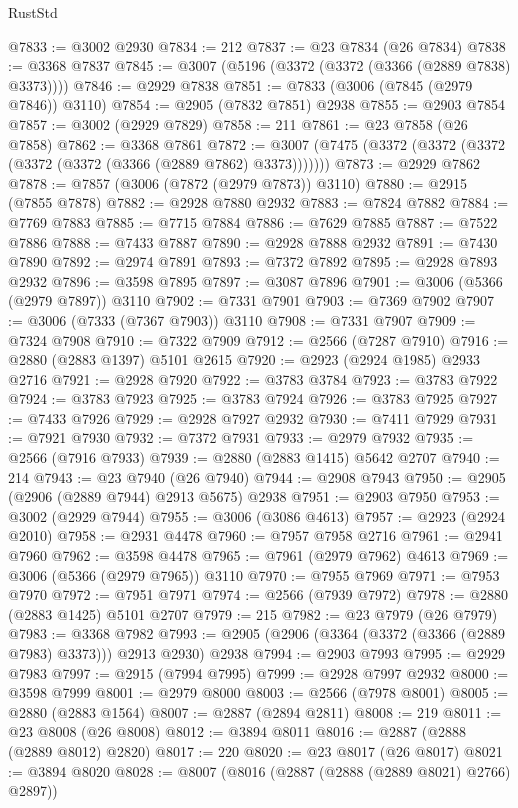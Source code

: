 \begin{lexlean}{RustStd}
\begin{coremodule}
@7833 := @3002 @2930
@7834 := 212
@7837 := @23 @7834 (@26 @7834)
@7838 := @3368 @7837
@7845 := @3007 (@5196 (@3372 (@3372 (@3366 (@2889 @7838) @3373))))
@7846 := @2929 @7838
@7851 := @7833 (@3006 (@7845 (@2979 @7846)) @3110)
@7854 := @2905 (@7832 @7851) @2938
@7855 := @2903 @7854
@7857 := @3002 (@2929 @7829)
@7858 := 211
@7861 := @23 @7858 (@26 @7858)
@7862 := @3368 @7861
@7872 := @3007 (@7475 (@3372 (@3372 (@3372 (@3372 (@3372 (@3366 (@2889 @7862) @3373)))))))
@7873 := @2929 @7862
@7878 := @7857 (@3006 (@7872 (@2979 @7873)) @3110)
@7880 := @2915 (@7855 @7878)
@7882 := @2928 @7880 @2932
@7883 := @7824 @7882
@7884 := @7769 @7883
@7885 := @7715 @7884
@7886 := @7629 @7885
@7887 := @7522 @7886
@7888 := @7433 @7887
@7890 := @2928 @7888 @2932
@7891 := @7430 @7890
@7892 := @2974 @7891
@7893 := @7372 @7892
@7895 := @2928 @7893 @2932
@7896 := @3598 @7895
@7897 := @3087 @7896
@7901 := @3006 (@5366 (@2979 @7897)) @3110
@7902 := @7331 @7901
@7903 := @7369 @7902
@7907 := @3006 (@7333 (@7367 @7903)) @3110
@7908 := @7331 @7907
@7909 := @7324 @7908
@7910 := @7322 @7909
@7912 := @2566 (@7287 @7910)
@7916 := @2880 (@2883 @1397) @5101 @2615
@7920 := @2923 (@2924 @1985) @2933 @2716
@7921 := @2928 @7920
@7922 := @3783 @3784
@7923 := @3783 @7922
@7924 := @3783 @7923
@7925 := @3783 @7924
@7926 := @3783 @7925
@7927 := @7433 @7926
@7929 := @2928 @7927 @2932
@7930 := @7411 @7929
@7931 := @7921 @7930
@7932 := @7372 @7931
@7933 := @2979 @7932
@7935 := @2566 (@7916 @7933)
@7939 := @2880 (@2883 @1415) @5642 @2707
@7940 := 214
@7943 := @23 @7940 (@26 @7940)
@7944 := @2908 @7943
@7950 := @2905 (@2906 (@2889 @7944) @2913 @5675) @2938
@7951 := @2903 @7950
@7953 := @3002 (@2929 @7944)
@7955 := @3006 (@3086 @4613)
@7957 := @2923 (@2924 @2010)
@7958 := @2931 @4478
@7960 := @7957 @7958 @2716
@7961 := @2941 @7960
@7962 := @3598 @4478
@7965 := @7961 (@2979 @7962) @4613
@7969 := @3006 (@5366 (@2979 @7965)) @3110
@7970 := @7955 @7969
@7971 := @7953 @7970
@7972 := @7951 @7971
@7974 := @2566 (@7939 @7972)
@7978 := @2880 (@2883 @1425) @5101 @2707
@7979 := 215
@7982 := @23 @7979 (@26 @7979)
@7983 := @3368 @7982
@7993 := @2905 (@2906 (@3364 (@3372 (@3366 (@2889 @7983) @3373))) @2913 @2930) @2938
@7994 := @2903 @7993
@7995 := @2929 @7983
@7997 := @2915 (@7994 @7995)
@7999 := @2928 @7997 @2932
@8000 := @3598 @7999
@8001 := @2979 @8000
@8003 := @2566 (@7978 @8001)
@8005 := @2880 (@2883 @1564)
@8007 := @2887 (@2894 @2811)
@8008 := 219
@8011 := @23 @8008 (@26 @8008)
@8012 := @3894 @8011
@8016 := @2887 (@2888 (@2889 @8012) @2820)
@8017 := 220
@8020 := @23 @8017 (@26 @8017)
@8021 := @3894 @8020
@8028 := @8007 (@8016 (@2887 (@2888 (@2889 @8021) @2766) @2897))

\end{coremodule}
\end{lexlean}
